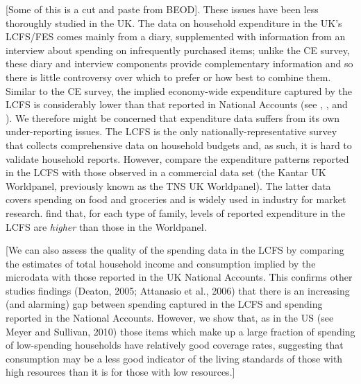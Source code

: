 [Some of this is a cut and paste from BEOD]. These issues have been less thoroughly studied in the UK. The data on household expenditure in the UK's LCFS/FES comes mainly from a diary, supplemented with information from an interview about spending on infrequently purchased items; unlike the CE survey, these diary and interview components provide complementary information and so there is little controversy over which to prefer or how best to combine them. Similar to the CE survey, the implied economy-wide expenditure captured by the LCFS is considerably lower than that reported in National Accounts (see \citealp{Deaton2005}, \citealp{Attanasio2006}, \citealp{Crossley2010} and \citet{Barrettetal2014}). We therefore might be concerned that expenditure data suffers from
its own under-reporting issues. The LCFS is the only nationally-representative
survey that collects comprehensive data on household budgets and,
as such, it is hard to validate household reports. However, \citet{LeicesterOldfield2009}
compare the expenditure patterns reported in the LCFS with those observed
in a commercial data set (the Kantar UK Worldpanel, previously known
as the TNS UK Worldpanel). The latter data covers spending on food
and groceries and is widely used in industry for market research.
\citet{LeicesterOldfield2009} find that, for each type of family,
levels of reported expenditure in the LCFS are \textit{higher} than those
in the Worldpanel.  

[We can also assess the quality of the spending data in the LCFS by comparing the estimates of total household income and consumption implied by the microdata with those reported in the UK National Accounts. This confirms other studies findings (Deaton, 2005; Attanasio et al., 2006) that there is an increasing (and alarming) gap between spending captured in the LCFS and spending reported in the National Accounts. However, we show that, as in the US (see Meyer and Sullivan, 2010) those items which make up a large fraction of spending of low-spending households have relatively good coverage rates, suggesting that consumption may be a less good indicator of the living standards of those with high resources than it is for those with low resources.]

